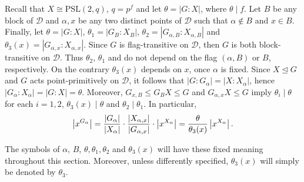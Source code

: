 \documentclass[a4paper,twopage,reqno,12pt]{amsart}
\theoremstyle{definition}
\numberwithin{equation}{section}
\newcommand{\PSL}{\mathrm{PSL}}
\renewcommand{\leq}{\leqslant}
\begin{document}
\bigskip
Recall that $X \cong \PSL(2,q)$, $q=p^f$ and let $\theta =\left\vert G:X\right\vert $, where $\theta \mid f$. Let $B$ be any block of $\mathcal{D}$ and $\alpha ,x$ be any two distinct
points of $\mathcal{D}$ such that $\alpha \notin B$ and $x\in B$. Finally,
let $\theta =\left\vert G:X\right\vert $,  $\theta _{1}=\left\vert
G_{B}:X_{B}\right\vert $, $\theta _{2}=\left\vert G_{\alpha ,B}:X_{\alpha
,B}\right\vert $ and $\theta _{3}(x)=\left\vert G_{\alpha ,x}:X_{\alpha
,x}\right\vert $. Since $G$ is flag-transitive on $\mathcal{D}$, then $G$ is
both block-transitive on $\mathcal{D}$. Thus $\theta _{2}$, $\theta _{1}$
and do not depend on the flag $(\alpha ,B)$ or $B$, respectively. On the contrary $%
\theta _{3}(x)$ depends on $x$, once $\alpha $ is fixed. Since $X\unlhd G$ and $G$ acts point-primitively on $\mathcal{D}$, it follows that
$\left\vert G:G_{\alpha }\right\vert =\left\vert
X:X_{\alpha }\right\vert $, hence $\left\vert G_{\alpha }:X_{\alpha }\right\vert =\left\vert
G:X\right\vert =\theta $. Moreover, $G_{x,B}\leq G_{B}X\leq G$ and $G_{\alpha ,x}X\leq G$ imply $\theta _{i}\mid \theta $ for each $i=1,2$, $\theta _{3}(x)\mid \theta $ and $\theta _{2}\mid \theta _{1}$. In particular, 
\begin{equation}\label{abroad}
\left\vert x^{G_{\alpha
}}\right\vert=\frac{\left\vert
G_{\alpha }\right\vert }{\left\vert X_{\alpha }\right\vert }\cdot \frac{%
\left\vert X_{\alpha ,x}\right\vert }{\left\vert G_{\alpha ,x}\right\vert }%
\cdot \left\vert x^{X_{\alpha }}\right\vert=\frac{\theta}{\theta_{3}(x)}\left\vert x^{X_{\alpha }}\right\vert\text{.}    
\end{equation}


\bigskip
The symbols of $\alpha$, $B$, $\theta, \theta_{1}, \theta _{2}$ and $\theta _{3}(x)$ will have these fixed meaning throughout this section. Moreover, unless differently specified, $\theta _{3}(x)$ will simply be denoted by $\theta _{3}$.

\bigskip
\end{document}
